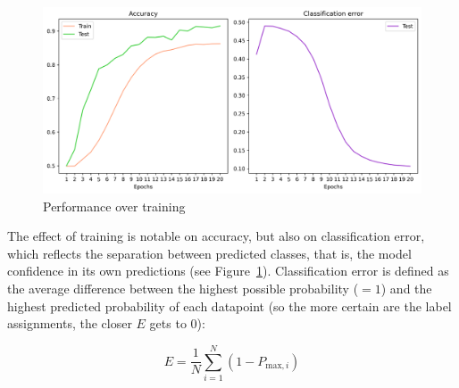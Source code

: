 \documentclass{article}
\begin{document}
\begin{figure}
  \centering
  \includegraphics[width=\textwidth]{figures/RoBERTa_learning_curves_2.png}
  \caption{Performance over training}
  \label{fig:roberta-learning-2}
\end{figure}

The effect of training is notable on accuracy, but also on classification error, which reflects the separation between predicted classes, that is, the model confidence in its own predictions (see Figure~\ref{fig:roberta-learning-2}). Classification error is defined as the average difference between the highest possible probability (\( =1 \)) and the highest predicted probability of each datapoint (so the more certain are the label assignments, the closer \( E \) gets to 0):

\[
E = \frac{1}{N} \sum_{i=1}^{N} (1 - P_{\text{max},i})
\]
\end{document}
